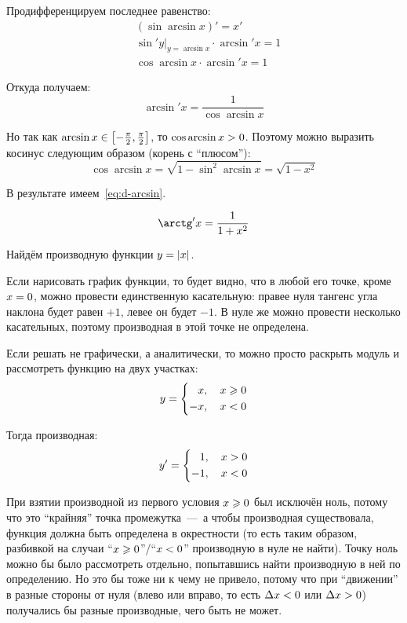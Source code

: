 \documentclass[a4paper,12pt]{article}
\begin{document}
  Продифференцируем последнее равенство:
  \[
    \begin{aligned}
      &(\sin \arcsin x)' = x'\\
      &\sin' y|_{y = \arcsin x} \cdot \arcsin' x = 1\\
      &\cos \arcsin x \cdot \arcsin' x = 1
    \end{aligned}
  \]
  
  Откуда получаем:
  \[
    \arcsin' x = \frac{1}{\cos \arcsin x}
  \]
  
  Но так как $\arcsin x \hm\in \left[{-}\frac{\pi}{2}, \frac{\pi}{2}\right]$, то $\cos \arcsin x \hm> 0$.
  Поэтому можно выразить косинус следующим образом (корень с ``плюсом''):
  \[
    \cos \arcsin x = \sqrt{1 - \sin^2 \arcsin x} = \sqrt{1 - x^2}
  \]
  
  В результате имеем~\eqref{eq:d-arcsin}.
  
  \begin{equation}
    \arctg' x = \frac{1}{1 + x^2}
  \end{equation}
  
  \begin{example}
    Найдём производную функции $y \hm= |x|$.
    
    Если нарисовать график функции, то будет видно, что в любой его точке, кроме $x \hm= 0$, можно провести единственную касательную: правее нуля тангенс угла наклона будет равен $+1$, левее он будет $-1$.
    В нуле же можно провести несколько касательных, поэтому производная в этой точке не определена.
    
    Если решать не графически, а аналитически, то можно просто раскрыть модуль и рассмотреть функцию на двух участках:
    \[
      y = \left\{
        \begin{aligned}
          &\hphantom{{+}}x,\quad x \geq 0\\
          &{-}x,\quad x < 0
        \end{aligned}
      \right.
    \]
    
    Тогда производная:
    \[
      y' = \left\{
        \begin{aligned}
          &\hphantom{{+}}1,\quad x > 0\\
          &{-}1,\quad x < 0
        \end{aligned}
      \right.
    \]
    
    При взятии производной из первого условия $x \hm\geq 0$ был исключён ноль, потому что это ``крайняя'' точка промежутка~---~а чтобы производная существовала, функция должна быть определена в окрестности (то есть таким образом, разбивкой на случаи ``$x \hm\geq 0$''/``$x \hm< 0$'' производную в нуле не найти).
    Точку ноль можно бы было рассмотреть отдельно, попытавшись найти производную в ней по определению.
    Но это бы тоже ни к чему не привело, потому что при ``движении'' в разные стороны от нуля (влево или вправо, то есть $\Dt x \hm< 0$ или $\Dt x \hm> 0$) получались бы разные производные, чего быть не может.
  \end{example}
  
\end{document}
